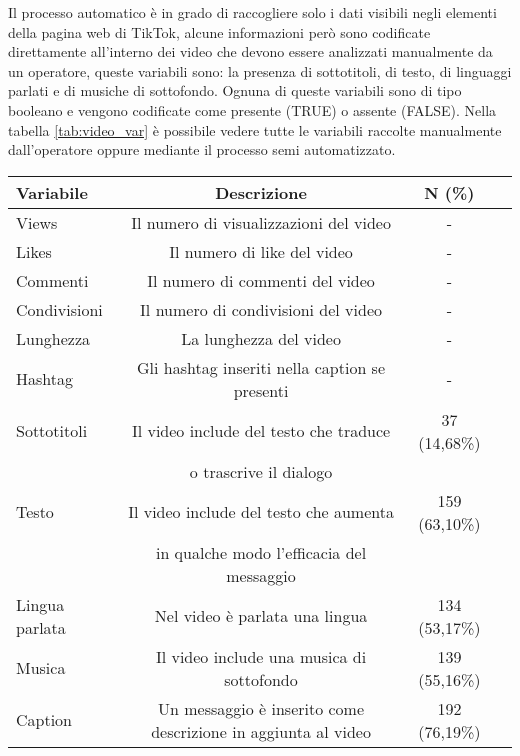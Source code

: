 Il processo automatico è in grado di raccogliere solo i dati visibili negli elementi della pagina web di TikTok, alcune informazioni 
però sono codificate direttamente all'interno dei video che devono essere analizzati manualmente da un operatore, queste variabili sono: 
la presenza di sottotitoli, di testo, di linguaggi parlati e di musiche di sottofondo. Ognuna di queste variabili sono di tipo 
booleano e vengono codificate come presente (TRUE) o assente (FALSE). Nella tabella \ref{tab:video_var} è possibile vedere tutte 
le variabili raccolte manualmente dall'operatore oppure mediante il processo semi automatizzato.

\begin{table*}[htb]
    \centering
    \small
    \begin{tabular}{l c c r}
        \hline
        Variabile & Descrizione & N (\%) \\
        \hline
        Views & Il numero di visualizzazioni del video & - \\
        Likes & Il numero di like del video & - \\
        Commenti & Il numero di commenti del video & - \\
        Condivisioni & Il numero di condivisioni del video & - \\
        Lunghezza & La lunghezza del video & - \\
        Hashtag & Gli hashtag inseriti nella caption se presenti & - \\
        Sottotitoli & Il video include del testo che traduce & 37 (14,68\%) \\
                    & o trascrive il dialogo & \\
        Testo & Il video include del testo che aumenta & 159 (63,10\%) \\
              & in qualche modo l'efficacia del messaggio & \\
        Lingua parlata & Nel video è parlata una lingua & 134 (53,17\%) \\
        Musica & Il video include una musica di sottofondo & 139 (55,16\%) \\
        Caption & Un messaggio è inserito come descrizione in aggiunta al video & 192 (76,19\%) \\  
        \hline
    \end{tabular}    
    \caption{Variabili che indicizzano il video di TikTok. Le variabili Sottotitoli, Testo, Lingua parlata, Musica e Caption
    sono state codificate come presente (1) o assente (0). }
    \label{tab:video_var}
\end{table*}


